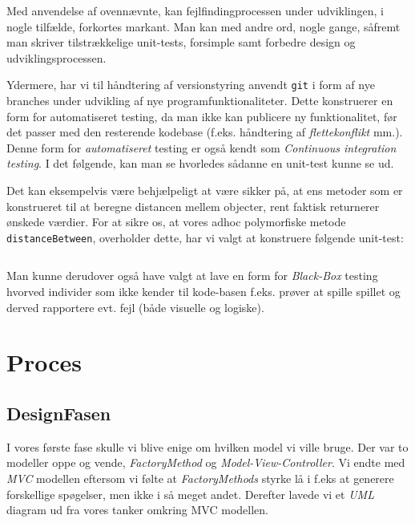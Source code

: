 \documentclass{article}
\newcommand{\code}[1]{\small\texttt{#1}}
\newcommand{\snippet}[3]{\inputminted[firstline=#1,lastline=#2,linenos,
xleftmargin=1.5em, breaklines]{java}{#3}}
\theoremstyle{mytheoremstyle}
\theoremstyle{mytheoremstyle}
\theoremstyle{myproblemstyle}
\begin{document}
Med anvendelse af ovennævnte, kan fejlfindingprocessen under udviklingen, i
nogle tilfælde, forkortes markant. Man kan med andre ord, nogle gange, såfremt
man skriver tilstrækkelige unit-tests, forsimple samt forbedre design og
udviklingsprocessen.

Ydermere, har vi til håndtering af versionstyring anvendt \code{git} i form af
nye branches under udvikling af nye programfunktionaliteter. Dette konstruerer
en form for automatiseret testing, da man ikke kan publicere ny funktionalitet,
før det passer med den resterende kodebase (f.eks. håndtering af
\textit{flettekonflikt} mm.). Denne form for \textit{automatiseret} testing er
også kendt som \textit{Continuous integration testing}. I det følgende, kan man
se hvorledes sådanne en unit-test kunne se ud.

Det kan eksempelvis være behjælpeligt at være sikker på, at ens metoder som er
konstrueret til at beregne distancen mellem objecter, rent faktisk returnerer
ønskede værdier. For at sikre os, at vores adhoc polymorfiske metode
\code{distanceBetween}, overholder dette, har vi valgt at konstruere følgende
unit-test:

\snippet{12}{55}{./code/AlgebraTest.java}

Man kunne derudover også have valgt at lave en form for \textit{Black-Box}
testing hvorved individer som ikke kender til kode-basen f.eks. prøver at spille
spillet og derved rapportere evt. fejl (både visuelle og logiske).


\section{Proces}\label{sec:Proces} %
\subsection{DesignFasen}
I vores første fase skulle vi blive enige om hvilken model vi ville bruge. Der
var to modeller oppe og vende, \textit{FactoryMethod} og
\textit{Model-View-Controller}. Vi endte med \textit{MVC} modellen eftersom vi
følte at \textit{FactoryMethods} styrke lå i f.eks at generere forskellige
spøgelser, men ikke i så meget andet. Derefter lavede vi et \textit{UML} diagram
ud fra vores tanker omkring MVC modellen.
\end{document}
